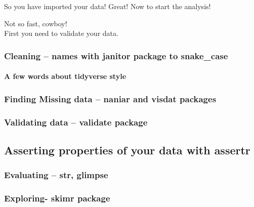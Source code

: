\documentclass[
]{book}
\begin{document}
So you have imported your data!
Great!
Now to start the analysis!

Not so fast, cowboy!\\
First you need to validate your data.

\hypertarget{cleaning-names-with-janitor-package-to-snake_case}{%
\subsubsection{Cleaning -- names with janitor package to snake\_case}\label{cleaning-names-with-janitor-package-to-snake_case}}

\hypertarget{a-few-words-about-tidyverse-style}{%
\paragraph{A few words about tidyverse style}\label{a-few-words-about-tidyverse-style}}

\hypertarget{finding-missing-data-naniar-and-visdat-packages}{%
\subsubsection{Finding Missing data -- naniar and visdat packages}\label{finding-missing-data-naniar-and-visdat-packages}}

\hypertarget{validating-data-validate-package}{%
\subsubsection{Validating data -- validate package}\label{validating-data-validate-package}}

\hypertarget{asserting-properties-of-your-data-with-assertr}{%
\subsection{Asserting properties of your data with assertr}\label{asserting-properties-of-your-data-with-assertr}}

\hypertarget{evaluating-str-glimpse}{%
\subsubsection{Evaluating -- str, glimpse}\label{evaluating-str-glimpse}}

\hypertarget{exploring--skimr-package}{%
\subsubsection{Exploring- skimr package}\label{exploring--skimr-package}}
\end{document}
